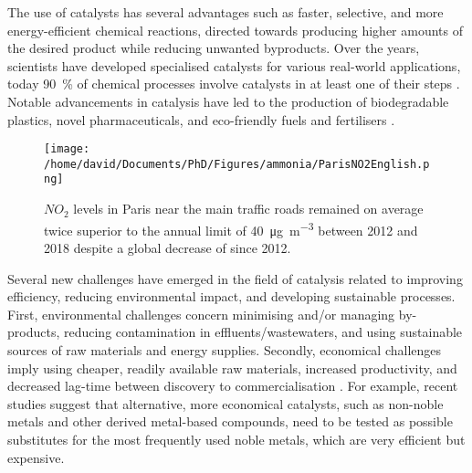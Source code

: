 The use of catalysts has several advantages such as faster, selective, and more energy-efficient chemical reactions, directed towards producing higher amounts of the desired product while reducing unwanted byproducts.
Over the years, scientists have developed specialised catalysts for various real-world applications, today \qty{90}{\percent} of chemical processes involve catalysts in at least one of their steps \parencite{Weiner1998, DeVries2012}.
Notable advancements in catalysis have led to the production of biodegradable plastics, novel pharmaceuticals, and eco-friendly fuels and fertilisers \parencite{Fechete2012}.

\begin{figure}[!htb]
    \centering
    \texttt{[image: /home/david/Documents/PhD/Figures/ammonia/ParisNO2English.png]}
    \caption{
        $NO_2$ levels in Paris near the main traffic roads remained on average twice superior to the annual limit of \qty{40}{\ug \per \m^3} \parencite{AirParis} between 2012 and 2018 despite a global decrease of since 2012.
    }
    \label{fig:NO2Paris}
\end{figure}

Several new challenges have emerged in the field of catalysis related to improving efficiency, reducing environmental impact, and developing sustainable processes.
First, environmental challenges concern minimising and/or managing by-products, reducing contamination in effluents/wastewaters, and using sustainable sources of raw materials \parencite{Ludwig2017, Lange2021} and energy supplies.
Secondly, economical challenges imply using cheaper, readily available raw materials, increased productivity, and decreased lag-time between discovery to commercialisation \parencite{Keisuke2019, Gunay2021}.
For example, recent studies suggest that alternative, more economical catalysts, such as non-noble metals \parencite{Zhong2021} and other derived metal-based compounds, need to be tested as possible substitutes for the most frequently used noble metals, which are very efficient but expensive.

